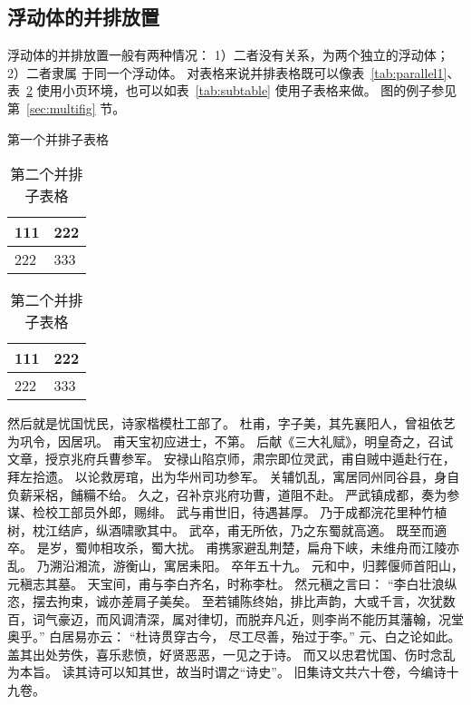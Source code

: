 \subsection{浮动体的并排放置}
浮动体的并排放置一般有两种情况：
1）二者没有关系，为两个独立的浮动体；
2）二者隶属
于同一个浮动体。
对表格来说并排表格既可以像表~\ref{tab:parallel1}、表~\ref{tab:parallel2}
使用小页环境，也可以如表~\ref{tab:subtable} 使用子表格来做。
图的例子参见第~\ref{sec:multifig} 节。
\begin{table}[ht]
  \noindent\begin{minipage}{0.5\textwidth}
    \centering
    \caption{第一个并排子表格}
    \label{tab:parallel1}
    \begin{tabular}{p{2cm}p{2cm}}
      \toprule[1.5pt]
      111 & 222 \\\midrule[1pt]
      222 & 333 \\\bottomrule[1.5pt]
    \end{tabular}
  \end{minipage}
  \begin{minipage}{0.5\textwidth}
    \centering
    \caption{第二个并排子表格}
    \label{tab:parallel2}
    \begin{tabular}{p{2cm}p{2cm}}
      \toprule[1.5pt]
      111 & 222 \\\midrule[1pt]
      222 & 333 \\\bottomrule[1.5pt]
    \end{tabular}
  \end{minipage}
\end{table}

然后就是忧国忧民，诗家楷模杜工部了。
杜甫，字子美，其先襄阳人，曾祖依艺为巩令，因居巩。
甫天宝初应进士，不第。
后献《三大礼赋》，明皇奇之，召试文章，授京兆府兵曹参军。
安禄山陷京师，肃宗即位灵武，甫自贼中遁赴行在，拜左拾遗。
以论救房琯，出为华州司功参军。
关辅饥乱，寓居同州同谷县，身自负薪采梠，餔糒不给。
久之，召补京兆府功曹，道阻不赴。
严武镇成都，奏为参谋、检校工部员外郎，赐绯。
武与甫世旧，待遇甚厚。
乃于成都浣花里种竹植树，枕江结庐，纵酒啸歌其中。
武卒，甫无所依，乃之东蜀就高適。
既至而適卒。
是岁，蜀帅相攻杀，蜀大扰。
甫携家避乱荆楚，扁舟下峡，未维舟而江陵亦乱。
乃溯沿湘流，游衡山，寓居耒阳。
卒年五十九。
元和中，归葬偃师首阳山，元稹志其墓。
天宝间，甫与李白齐名，时称李杜。
然元稹之言曰：
“李白壮浪纵恣，摆去拘束，诚亦差肩子美矣。
至若铺陈终始，排比声韵，大或千言，次犹数百，词气豪迈，而风调清深，属对律切，而脱弃凡近，则李尚不能历其藩翰，况堂奥乎。”
白居易亦云：
“杜诗贯穿古今，  尽工尽善，殆过于李。”
元、白之论如此。
盖其出处劳佚，喜乐悲愤，好贤恶恶，一见之于诗。
而又以忠君忧国、伤时念乱为本旨。
读其诗可以知其世，故当时谓之“诗史”。
旧集诗文共六十卷，今编诗十九卷。

